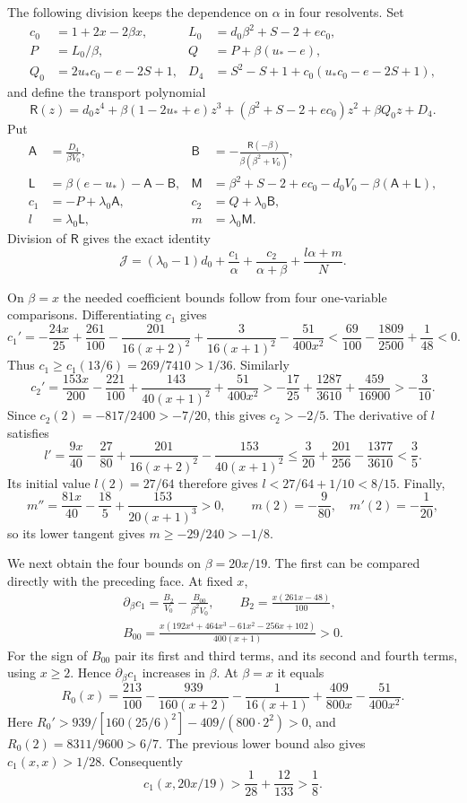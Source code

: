 The following division keeps the dependence on $\alpha$ in four resolvents.
Set
\begin{align*}
 c_0&=1+2x-2\beta x,&
 L_0&=d_0\beta^2+S-2+ec_0,\\
 P&=L_0/\beta,& Q&=P+\beta(u_*-e),\\
 Q_0&=2u_*c_0-e-2S+1,&
 D_4&=S^2-S+1+c_0(u_*c_0-e-2S+1),
\end{align*}
and define the transport polynomial
\[
 \mathsf R(z)=d_0z^4+\beta(1-2u_*+e)z^3
 +(\beta^2+S-2+ec_0)z^2+\beta Q_0z+D_4.
\]
Put
\begin{align*}
 \mathsf A&=\frac{D_4}{\beta V_0},&
 \mathsf B&=-\frac{\mathsf R(-\beta)}{\beta(\beta^2+V_0)},\\
 \mathsf L&=\beta(e-u_*)-\mathsf A-\mathsf B,&
 \mathsf M&=\beta^2+S-2+ec_0-d_0V_0-\beta(\mathsf A+\mathsf L),\\
 c_1&=-P+\lambda_0\mathsf A,&c_2&=Q+\lambda_0\mathsf B,\\
 l&=\lambda_0\mathsf L,&m&=\lambda_0\mathsf M.
\end{align*}
Division of $\mathsf R$ gives the exact identity
\begin{equation}\label{eq:ss-J-resolvents}
 \mathcal J=(\lambda_0-1)d_0+\frac{c_1}{\alpha}
    +\frac{c_2}{\alpha+\beta}+\frac{l\alpha+m}{N}.
\end{equation}

On $\beta=x$ the needed coefficient bounds follow from four one-variable
comparisons. Differentiating $c_1$ gives
\[
 c_1'=-\frac{24x}{25}+\frac{261}{100}
 -\frac{201}{16(x+2)^2}+\frac3{16(x+1)^2}-\frac{51}{400x^2}
 <\frac{69}{100}-\frac{1809}{2500}+\frac1{48}<0.
\]
Thus $c_1\ge c_1(13/6)=269/7410>1/36$. Similarly
\[
 c_2'=\frac{153x}{200}-\frac{221}{100}
       +\frac{143}{40(x+1)^2}+\frac{51}{400x^2}
 >-\frac{17}{25}+\frac{1287}{3610}+\frac{459}{16900}>-\frac3{10}.
\]
Since $c_2(2)=-817/2400>-7/20$, this gives $c_2>-2/5$.
The derivative of $l$ satisfies
\[
 l'=\frac{9x}{40}-\frac{27}{80}
       +\frac{201}{16(x+2)^2}-\frac{153}{40(x+1)^2}
 \le\frac3{20}+\frac{201}{256}-\frac{1377}{3610}<\frac35.
\]
Its initial value $l(2)=27/64$ therefore gives $l<27/64+1/10<8/15$.
Finally,
\[
 m''=\frac{81x}{40}-\frac{18}{5}+\frac{153}{20(x+1)^3}>0,
 \qquad m(2)=-\frac9{80},\quad m'(2)=-\frac1{20},
\]
so its lower tangent gives $m\ge-29/240>-1/8$.

We next obtain the four bounds on $\beta=20x/19$. The first can be compared
directly with the preceding face. At fixed $x$,
\begin{gather*}
 \partial_\beta c_1=\frac{B_2}{V_0}-\frac{B_{00}}{\beta^2V_0},\qquad
 B_2=\frac{x(261x-48)}{100},\\
 B_{00}=\frac{x(192x^4+464x^3-61x^2-256x+102)}{400(x+1)}>0.
\end{gather*}
For the sign of $B_{00}$ pair its first and third terms, and its second and
fourth terms, using $x\ge2$. Hence $\partial_\beta c_1$ increases in $\beta$.
At $\beta=x$ it equals
\[
 R_0(x)=\frac{213}{100}-\frac{939}{160(x+2)}-\frac1{16(x+1)}
          +\frac{409}{800x}-\frac{51}{400x^2}.
\]
Here $R_0'>939/[160(25/6)^2]-409/(800\cdot2^2)>0$, and
$R_0(2)=8311/9600>6/7$. The previous lower bound also gives
$c_1(x,x)>1/28$. Consequently
\[
 c_1(x,20x/19)>\frac1{28}+\frac{12}{133}>\frac18.
\]

